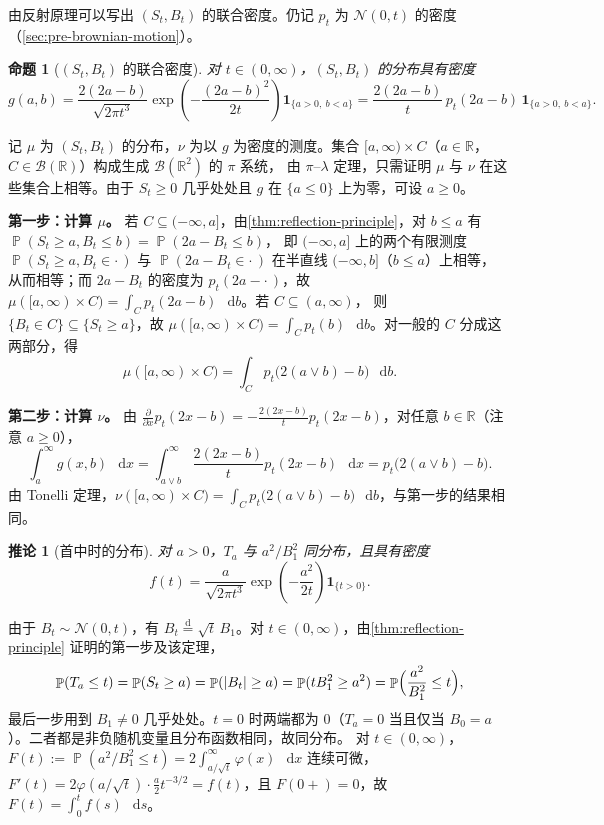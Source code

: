 \documentclass[UTF8,11pt,a4paper,oneside,fontset=fandol]{ctexrep}
\makeatletter
\numberwithin{equation}{section}
\theoremstyle{zhthm}
\newtheorem{proposition}[theorem]{命题}
\newtheorem{corollary}[theorem]{推论}
\renewenvironment{proof}[1][\proofname]{\par
  \pushQED{\qed}%
  \normalfont\topsep6\p@\@plus6\p@\relax
  \trivlist
  \item[\hskip\labelsep\bfseries#1\hspace{0.5em}]\ignorespaces
}{%
  \popQED\endtrivlist\@endpefalse
}
\renewcommand{\proofname}{证明}
\newcommand{\R}{\mathbb{R}}
\newcommand{\B}{\mathcal{B}}
\DeclareMathOperator{\Prob}{\mathbb{P}}
\newcommand{\Normal}{\mathcal{N}}
\newcommand{\deq}{\overset{\mathrm{d}}{=}}
\newcommand{\ind}[1]{\mathbf{1}_{#1}}
\newcommand{\dd}{\mathop{}\!\mathrm{d}}
\DeclarePairedDelimiter{\abs}{\lvert}{\rvert}
\makeatother
\begin{document}
由反射原理可以写出 $(S_t,B_t)$ 的联合密度。仍记 $p_t$ 为 $\Normal(0,t)$ 的密度（\cref{sec:pre-brownian-motion}）。

\begin{proposition}[$(S_t,B_t)$ 的联合密度]
\label{prop:max-joint-density}
对 $t\in(0,\infty)$，$(S_t,B_t)$ 的分布具有密度
\begin{equation}
  \label{eq:max-joint-density}
  g(a,b)=\frac{2(2a-b)}{\sqrt{2\pi t^3}}\exp\!\left(-\frac{(2a-b)^2}{2t}\right)\ind{\{a>0,\ b<a\}}
  =\frac{2(2a-b)}{t}\,p_t(2a-b)\,\ind{\{a>0,\ b<a\}}.
\end{equation}
\end{proposition}

\begin{proof}
记 $\mu$ 为 $(S_t,B_t)$ 的分布，$\nu$ 为以 $g$ 为密度的测度。集合 $[a,\infty)\times C$（$a\in\R$，$C\in\B(\R)$）构成生成 $\B(\R^2)$ 的 $\pi$ 系统，
由 $\pi$--$\lambda$ 定理，只需证明 $\mu$ 与 $\nu$ 在这些集合上相等。由于 $S_t\ge0$ 几乎处处且 $g$ 在 $\{a\le0\}$ 上为零，可设 $a\ge0$。

\textbf{\boldmath 第一步：计算 $\mu$。}
若 $C\subseteq(-\infty,a]$，由\cref{thm:reflection-principle}，对 $b\le a$ 有 $\Prob(S_t\ge a,B_t\le b)=\Prob(2a-B_t\le b)$，
即 $(-\infty,a]$ 上的两个有限测度 $\Prob(S_t\ge a,B_t\in\cdot\,)$ 与 $\Prob(2a-B_t\in\cdot\,)$ 在半直线 $(-\infty,b]$（$b\le a$）上相等，
从而相等；而 $2a-B_t$ 的密度为 $p_t(2a-\cdot\,)$，故 $\mu([a,\infty)\times C)=\int_Cp_t(2a-b)\,\dd b$。若 $C\subseteq(a,\infty)$，
则 $\{B_t\in C\}\subseteq\{S_t\ge a\}$，故 $\mu([a,\infty)\times C)=\int_Cp_t(b)\,\dd b$。对一般的 $C$ 分成这两部分，得
\[
  \mu([a,\infty)\times C)=\int_Cp_t\bigl(2(a\vee b)-b\bigr)\,\dd b.
\]

\textbf{\boldmath 第二步：计算 $\nu$。}
由 $\frac{\partial}{\partial x}p_t(2x-b)=-\frac{2(2x-b)}{t}p_t(2x-b)$，对任意 $b\in\R$（注意 $a\ge0$），
\[
  \int_a^\infty g(x,b)\,\dd x=\int_{a\vee b}^\infty\frac{2(2x-b)}{t}p_t(2x-b)\,\dd x=p_t\bigl(2(a\vee b)-b\bigr).
\]
由 Tonelli 定理，$\nu([a,\infty)\times C)=\int_Cp_t\bigl(2(a\vee b)-b\bigr)\,\dd b$，与第一步的结果相同。
\end{proof}

\begin{corollary}[首中时的分布]
\label{cor:hitting-time-law}
对 $a>0$，$T_a$ 与 $a^2/B_1^2$ 同分布，且具有密度
\[
  f(t)=\frac{a}{\sqrt{2\pi t^3}}\exp\!\left(-\frac{a^2}{2t}\right)\ind{\{t>0\}}.
\]
\end{corollary}

\begin{proof}
由于 $B_t\sim\Normal(0,t)$，有 $B_t\deq\sqrt t\,B_1$。对 $t\in(0,\infty)$，由\cref{thm:reflection-principle} 证明的第一步及该定理，
\[
  \Prob(T_a\le t)=\Prob(S_t\ge a)=\Prob(\abs{B_t}\ge a)=\Prob(tB_1^2\ge a^2)=\Prob\Bigl(\frac{a^2}{B_1^2}\le t\Bigr),
\]
最后一步用到 $B_1\ne0$ 几乎处处。$t=0$ 时两端都为 $0$（$T_a=0$ 当且仅当 $B_0=a$）。二者都是非负随机变量且分布函数相同，故同分布。
对 $t\in(0,\infty)$，$F(t):=\Prob(a^2/B_1^2\le t)=2\int_{a/\sqrt t}^\infty\varphi(x)\,\dd x$ 连续可微，
$F'(t)=2\varphi(a/\sqrt t)\cdot\frac a2t^{-3/2}=f(t)$，且 $F(0+)=0$，故 $F(t)=\int_0^tf(s)\,\dd s$。
\end{proof}
\end{document}
